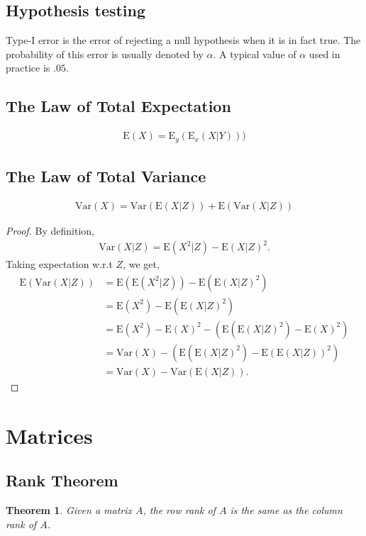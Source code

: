 \documentclass{amsart}
\newtheorem{theorem}{Theorem}
\theoremstyle{plain}
\numberwithin{equation}{section}
\begin{document}
\subsection{Hypothesis testing}
Type-I error is the error of 
rejecting a null hypothesis when it 
is in fact true. The probability of this error
is usually denoted by $\alpha$. A typical 
value of $\alpha$ used in practice is 
$.05$.

\subsection{The Law of Total Expectation}
\begin{align*}
\mathrm{E}(X) = \mathrm{E}_y(\mathrm{E}_x(X|Y)))
\end{align*}

\subsection{The Law of Total Variance}
\begin{align*}
\mathrm{Var}(X) = \mathrm{Var}(\mathrm{E}(X|Z))+
\mathrm{E}(\mathrm{Var}(X|Z)) 
\end{align*}

\begin{proof}
By definition,
\begin{align*}
\mathrm{Var}(X|Z) = \mathrm{E}(X^2|Z) - \mathrm{E}(X|Z)^2.
\end{align*}
Taking expectation w.r.t $Z$, we get,
\begin{align*}
\mathrm{E}(\mathrm{Var}(X|Z)) &= \mathrm{E}(\mathrm{E}(X^2|Z)) - \mathrm{E}(\mathrm{E}(X|Z)^2)\\
&= \mathrm{E}(X^2) - \mathrm{E}(\mathrm{E}(X|Z)^2)\\
&= \mathrm{E}(X^2) - \mathrm{E}(X)^2 - \left(\mathrm{E}(\mathrm{E}(X|Z)^2)-\mathrm{E}(X)^2\right)\\
&= \mathrm{Var}(X) - \left(\mathrm{E}(\mathrm{E}(X|Z)^2)-\mathrm{E}(\mathrm{E}(X|Z))^2\right)\\
&= \mathrm{Var}(X) - \mathrm{Var}(\mathrm{E}(X|Z)).
\end{align*}

\end{proof}
\section{Matrices}
\subsection{Rank Theorem}
\begin{theorem}
Given a matrix $A$, the row rank of $A$ is the 
same as the column rank of $A$. 
\end{theorem}
\end{document}
